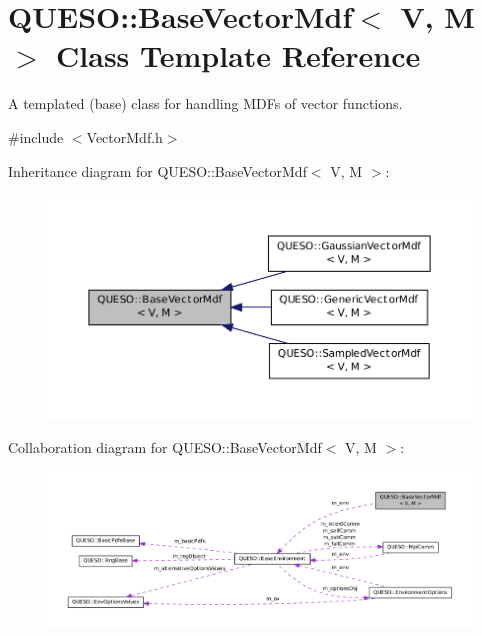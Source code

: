 \hypertarget{class_q_u_e_s_o_1_1_base_vector_mdf}{\section{Q\-U\-E\-S\-O\-:\-:Base\-Vector\-Mdf$<$ V, M $>$ Class Template Reference}
\label{class_q_u_e_s_o_1_1_base_vector_mdf}
}


A templated (base) class for handling M\-D\-Fs of vector functions.  




{\ttfamily \#include $<$Vector\-Mdf.\-h$>$}



Inheritance diagram for Q\-U\-E\-S\-O\-:\-:Base\-Vector\-Mdf$<$ V, M $>$\-:
\nopagebreak
\begin{figure}[H]
\begin{center}
\leavevmode
\includegraphics[width=350pt]{class_q_u_e_s_o_1_1_base_vector_mdf__inherit__graph}
\end{center}
\end{figure}


Collaboration diagram for Q\-U\-E\-S\-O\-:\-:Base\-Vector\-Mdf$<$ V, M $>$\-:
\nopagebreak
\begin{figure}[H]
\begin{center}
\leavevmode
\includegraphics[width=350pt]{class_q_u_e_s_o_1_1_base_vector_mdf__coll__graph}
\end{center}
\end{figure}
